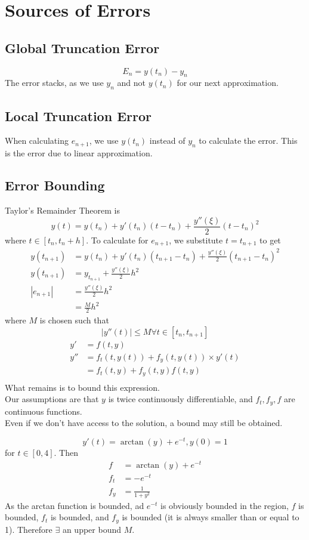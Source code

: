 \documentclass[12pt]{article}
\begin{document}
\section{Sources of Errors}

\subsection{Global Truncation Error}
$$E_n = y(t_n) - y_n$$
The error stacks, as we use $y_n$ and not $y(t_n)$ for our next approximation.

\subsection{Local Truncation Error}
When calculating $e_{n+1}$, we use $y(t_n)$ instead of $y_n$ to calculate the error. This is the error due to linear approximation.

\subsection{Error Bounding}
Taylor's Remainder Theorem is
$$y(t) = y(t_n) + y'(t_n)(t-t_n) + \frac{y''(\xi)}{2}(t-t_n)^2$$
where $t \in [t_n,t_n+h]$. To calculate for $e_{n+1}$, we substitute $t = t_{n+1}$ to get
\begin{align*}
	y(t_{n+1}) &= y(t_n) + y'(t_n)(t_{n+1}-t_n) + \frac{y''(\xi)}{2}(t_{n+1}-t_n)^2 \\
	y(t_{n+1}) &= y_{t_{n+1}} + \frac{y''(\xi)}{2}h^2 \\
	|e_{n+1}| &= \frac{y''(\xi)}{2}h^2 \\
		  &= \frac{M}{2}h^2
\end{align*}
where $M$ is chosen such that
$$|y''(t)| \leq M \forall t\in[t_n,t_{n+1}]$$
\begin{align*}
	y' &= f(t,y) \\
	y'' &= f_t(t,y(t)) + f_y(t,y(t))\times y'(t) \\
	    &= f_t(t,y) + f_y(t,y)f(t,y) \\
\end{align*}
What remains is to bound this expression. \\
Our assumptions are that $y$ is twice continuously differentiable, and $f_t, f_y, f$ are continuous functions. \\
Even if we don't have access to the solution, a bound may still be obtained.

\begin{ex}
	$$y'(t) = \arctan(y) + e^{-t}, y(0) = 1$$
	for $t\in[0,4]$. Then
	\begin{align*}
		f &= \arctan(y) + e^{-t} \\
		f_t &= -e^{-t} \\
		f_y &= \frac{1}{1+y^2}
	\end{align*}
	As the arctan function is bounded, ad $e^{-t}$ is obviously bounded in the region, $f$ is bounded, $f_t$ is bounded, and $f_y$ is bounded (it is always smaller than or equal to 1). Therefore $\exists$ an upper bound $M$.
\end{ex}
\end{document}
